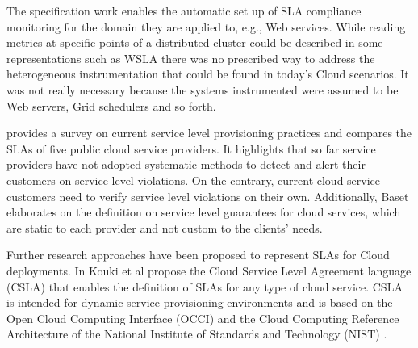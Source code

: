 The specification work enables the automatic set up of SLA compliance monitoring for the domain they are applied to, e.g., Web services. While reading metrics at specific points of a distributed cluster could be described in some representations such as WSLA there was no prescribed way to address the heterogeneous instrumentation that could be found in today's Cloud scenarios. It was not really necessary because the systems instrumented were assumed to be Web servers, Grid schedulers and so forth.

\cite{baset} provides a survey on current service level provisioning practices and compares the SLAs of five public cloud service providers. It highlights that so far service providers have not adopted systematic methods to detect and alert their customers on service level violations. On the contrary, current cloud service customers need to verify service level violations on their own. Additionally, Baset elaborates on the definition on service level guarantees for cloud services, which are static to each provider and not custom to the clients' needs.

Further research approaches have been proposed to represent SLAs for Cloud deployments. In \cite{kouki} Kouki et al propose the Cloud Service Level Agreement language (CSLA) that enables the definition of SLAs for any type of cloud service. CSLA is intended for dynamic service provisioning environments and is based on the Open Cloud Computing Interface (OCCI) \cite{occi} and the Cloud Computing Reference Architecture of the National Institute of Standards and Technology (NIST) \cite{nist}.


